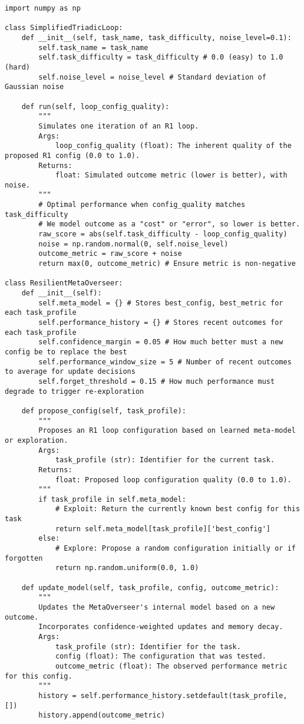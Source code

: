 \documentclass{article}
\begin{document}
\begin{verbatim}
import numpy as np

class SimplifiedTriadicLoop:
    def __init__(self, task_name, task_difficulty, noise_level=0.1):
        self.task_name = task_name
        self.task_difficulty = task_difficulty # 0.0 (easy) to 1.0 (hard)
        self.noise_level = noise_level # Standard deviation of Gaussian noise

    def run(self, loop_config_quality):
        """
        Simulates one iteration of an R1 loop.
        Args:
            loop_config_quality (float): The inherent quality of the proposed R1 config (0.0 to 1.0).
        Returns:
            float: Simulated outcome metric (lower is better), with noise.
        """
        # Optimal performance when config_quality matches task_difficulty
        # We model outcome as a "cost" or "error", so lower is better.
        raw_score = abs(self.task_difficulty - loop_config_quality)
        noise = np.random.normal(0, self.noise_level)
        outcome_metric = raw_score + noise
        return max(0, outcome_metric) # Ensure metric is non-negative

class ResilientMetaOverseer:
    def __init__(self):
        self.meta_model = {} # Stores best_config, best_metric for each task_profile
        self.performance_history = {} # Stores recent outcomes for each task_profile
        self.confidence_margin = 0.05 # How much better must a new config be to replace the best
        self.performance_window_size = 5 # Number of recent outcomes to average for update decisions
        self.forget_threshold = 0.15 # How much performance must degrade to trigger re-exploration

    def propose_config(self, task_profile):
        """
        Proposes an R1 loop configuration based on learned meta-model or exploration.
        Args:
            task_profile (str): Identifier for the current task.
        Returns:
            float: Proposed loop configuration quality (0.0 to 1.0).
        """
        if task_profile in self.meta_model:
            # Exploit: Return the currently known best config for this task
            return self.meta_model[task_profile]['best_config']
        else:
            # Explore: Propose a random configuration initially or if forgotten
            return np.random.uniform(0.0, 1.0) 

    def update_model(self, task_profile, config, outcome_metric):
        """
        Updates the MetaOverseer's internal model based on a new outcome.
        Incorporates confidence-weighted updates and memory decay.
        Args:
            task_profile (str): Identifier for the task.
            config (float): The configuration that was tested.
            outcome_metric (float): The observed performance metric for this config.
        """
        history = self.performance_history.setdefault(task_profile, [])
        history.append(outcome_metric)
        

\end{verbatim}
\end{document}

